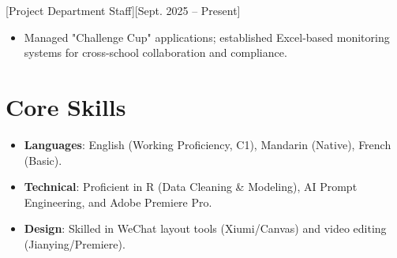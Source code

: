 \documentclass[a4paper]{resume}
\begin{document}
[Project Department Staff][Sept. 2025 -- Present]
\begin{itemize}
    \item Managed "Challenge Cup" applications; established Excel-based monitoring systems for cross-school collaboration and compliance.
\end{itemize}

\section{Core Skills}
\begin{itemize}
  \item \textbf{Languages}: English (Working Proficiency, C1), Mandarin (Native), French (Basic).
  \item \textbf{Technical}: Proficient in R (Data Cleaning \& Modeling), AI Prompt Engineering, and Adobe Premiere Pro.
  \item \textbf{Design}: Skilled in WeChat layout tools (Xiumi/Canvas) and video editing (Jianying/Premiere).
\end{itemize}
\end{document}
